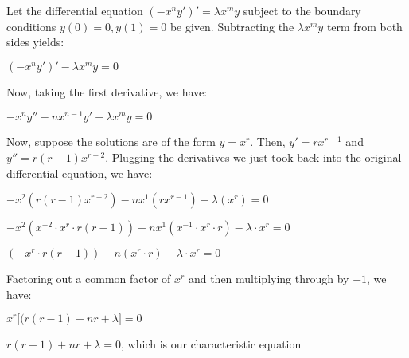 \documentclass[executivepaper]{article}
\begin{document}
\vspace*{-40mm}

\begin{flushleft}

Let the differential equation $(-x^ny')'=\lambda x^my$ subject to the boundary conditions $y(0)=0, y(1)=0$ be given. Subtracting the $\lambda x^my$ term from both sides yields:

\begin{center}

$(-x^ny')'-\lambda x^my=0$

\end{center}

Now, taking the first derivative, we have:

\begin{center}

$-x^ny''-nx^{n-1}y'-\lambda x^my=0$

\end{center}

\vspace{3mm}

Now, suppose the solutions are of the form $y=x^r$. Then, $y'=rx^{r-1}$ and $y''=r(r-1)x^{r-2}$. Plugging the derivatives we just took back into the original differential equation, we have:

\begin{center}

$-x^2(r(r-1)x^{r-2})-nx^1(rx^{r-1})-\lambda(x^r)=0$

\hspace{1mm}

$-x^2(x^{-2} \cdot x^r \cdot r(r-1))-nx^1(x^{-1} \cdot x^r \cdot r)-\lambda \cdot x^r=0$

\hspace{1mm}

$(-x^r \cdot r(r-1))-n(x^r \cdot r)-\lambda \cdot x^r=0$

\vspace{3mm}

Factoring out a common factor of $x^r$ and then multiplying through by $-1$, we have:

\vspace{3mm}

$x^r \bigg[(r(r-1)+nr+\lambda \bigg]=0$

\hspace{1mm}

$r(r-1)+nr+\lambda=0$, which is our characteristic equation

\end{center}


\end{flushleft}
\end{document}
